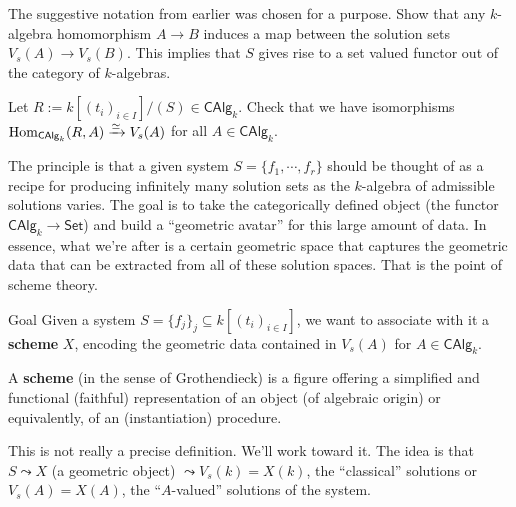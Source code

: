 \begin{ex}
    The suggestive notation from earlier was chosen for a purpose. Show that any  $k$-algebra homomorphism $A \to B$ induces a map between the solution sets $V_s(A) \to V_s(B)$. This implies that $S$ gives rise to a set valued functor out of the category of $k$-algebras.
\end{ex}
\begin{ex}
    Let $R:= k[(t_i ) _{i \in I}] / (S) \in \mathsf{CAlg} _k$. Check that we have isomorphisms $\operatorname{Hom} _{\mathsf{CAlg} _k}(R,A) \xrightarrow{\simeq } V_s(A)$ for all $A \in \mathsf{CAlg} _k$.
\end{ex}
The principle is that a given system $S=\{f_1, \cdots , f_r\} $ should be thought of as a recipe for producing infinitely many solution sets as the $k$-algebra of admissible solutions varies. The goal is to take the categorically defined object (the functor $\mathsf{CAlg} _k \to \mathsf{Set} $) and build a ``geometric avatar'' for this large amount of data. In essence, what we're after is a certain geometric space that captures the geometric data that can be extracted from all of these solution spaces. That is the point of scheme theory.

\begin{namedthing}{Goal} 
    Given a system $S= \{f_j \} _j  \subseteq k[(t_i )_{i \in I}]$, we want to associate with it a \textbf{scheme} $X$, encoding the geometric data contained in $V_s(A)$ for $A \in \mathsf{CAlg} _k$.
\end{namedthing}
\begin{definition}[]
    A \textbf{scheme} (in the sense of Grothendieck) is a figure offering a simplified and functional (faithful) representation of an object (of algebraic origin) or equivalently, of an (instantiation) procedure.
\end{definition}
This is not really a precise definition. We'll work toward it. The idea is that $S \leadsto X$ (a geometric object) $\leadsto V_s(k)=X(k)$, the ``classical'' solutions or $V_s(A)=X(A)$, the ``$A$-valued'' solutions of the system.

